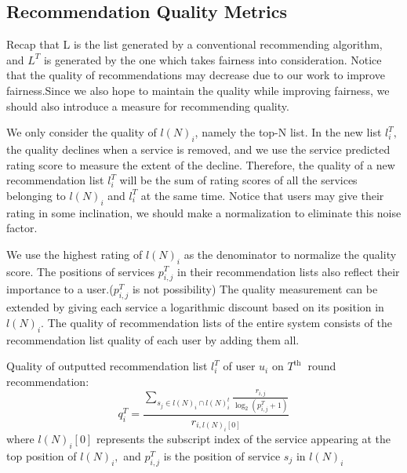 \subsection{Recommendation Quality Metrics}
Recap that L is the list generated by a conventional recommending algorithm, 
and $L^T$ is generated by the one which takes fairness into consideration.
Notice that the quality of recommendations may decrease due to our work to improve fairness.Since we also hope to maintain the quality while improving fairness, we should also introduce a measure for recommending quality.

We only consider the quality of $l(N)_{i}$, namely the top-N list. In the new list $l_{i}^{T},$ the quality declines when a service is removed, 
and we use the service predicted rating score to measure the extent of the decline.
Therefore, the quality of a new recommendation list $l_{i}^{T}$ will be the sum of rating scores of all the services belonging to $l(N)_{i}$ and $l_{i}^{T}$ at the same time. 
Notice that users may give their rating in some inclination, we should make a normalization to eliminate this noise factor.

We use the highest rating of $l(N)_{i}$ as the denominator to normalize the quality score. The positions of services $p_{i, j}^{T}$ in their recommendation lists also reflect their importance to a user.($p_{i, j}^{T}$ is not possibility) The quality measurement can be extended by giving each service a logarithmic discount based on its position in $l(N)_{i} .$ The quality of recommendation lists of the entire system consists of the recommendation list quality of each user by adding them all.

\begin{definition}
Quality of outputted recommendation list $l_{i}^{T}$ of user $u_{i}$ on $T^{\text {th }}$ round recommendation:
\begin{equation}
    q_{i}^{T}=\frac{\sum_{s_{j} \in l(N)_{i} \cap l(N)_{i}^{t}} \frac{r_{i, j}}{\log _{2}\left(p_{i, j}^{T}+1\right)}}{r_{i, l(N)_{i}[0]}}
\end{equation}
where $l(N)_{i}[0]$ represents the subscript index of the service appearing at the top position of $l(N)_{i},$ and $p_{i, j}^{T}$ is the position of service $s_{j}$ in $l(N)_{i}$
\end{definition}



